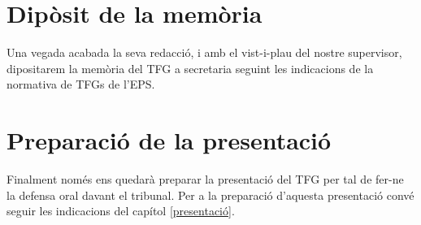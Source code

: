 \section{Dipòsit de la memòria}

Una vegada acabada la seva redacció, i amb el vist-i-plau del nostre supervisor, dipositarem la memòria del \ac{TFG} a secretaria seguint les indicacions de la normativa de \acsp{TFG} de l'\ac{EPS}.

\section{Preparació de la presentació}

Finalment només ens quedarà preparar la presentació del \ac{TFG} per tal de fer-ne la defensa oral davant el tribunal. Per a la preparació d'aquesta presentació convé seguir les indicacions del capítol \ref{presentació}.
